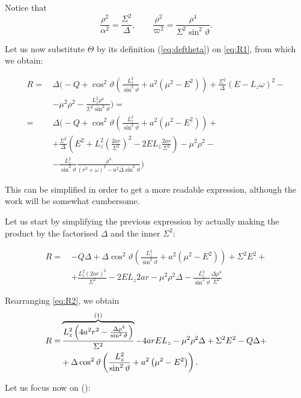 Notice that
\[
	\frac{\rho^2}{\alpha^2} = \frac{\Sigma^2}{\Delta}, \qquad \frac{\rho^2}{\varpi^2} = \frac{\rho^4}{\Sigma^2 \sin^2\vartheta}.
\]

Let us now substitute $\Theta$ by its definition (\autoref{eq:deftheta}) on \autoref{eq:R1}, from which we obtain:

\begin{align}
	R =\,& \Delta \biggl( -Q + \cos^2\vartheta\left( \frac{L_z^2}{\sin^2\vartheta} + a^2 (\mu^2 - E^2) \right) + \frac{\Sigma^2}{\Delta}(E - L_z\omega)^2 - \nonumber \\
	&- \mu^2\rho^2 - \frac{L_z^2\rho^4}{\Sigma^2\sin^2\vartheta} \biggr) = \nonumber \\
	=\,& \Delta \biggl( -Q + \cos^2\vartheta\left( \frac{L_z^2}{\sin^2\vartheta} + a^2 (\mu^2 - E^2) \right) + \nonumber \\
	&+ \frac{\Sigma^2}{\Delta}\left( E^2 + L_z^2\left( \frac{2ar}{\Sigma^2} \right)^2 - 2EL_z\frac{2ar}{\Sigma^2} \right)  - \mu^2\rho^2 - \nonumber \\
	&- \frac{L_z^2}{\sin^2\vartheta}\frac{\rho^4}{(r^2 + \omega)^2 - a^2\Delta\sin^2\vartheta} \biggr)
\end{align}

This can be simplified in order to get a more readable expression, although the work will be somewhat cumbersome.

Let us start by simplifying the previous expression by actually making the product by the factorised $\Delta$ and the inner $\Sigma^2$:

\begin{align}
	R =\,& -Q\Delta + \Delta\cos^2\vartheta\left( \frac{L_z^2}{\sin^2\vartheta} + a^2 (\mu^2 - E^2) \right) + \Sigma^2 E^2 + \nonumber \\
	&+ \frac{L_z^2 (2ar)^2}{\Sigma^2} - 2 E L_z 2ar  - \mu^2\rho^2\Delta - \frac{L_z^2}{\sin^2\vartheta}\frac{\Delta\rho^4}{\Sigma^2}
	\label{eq:R2}
\end{align}

Rearranging \autoref{eq:R2}, we obtain
\begin{align}
	R =& \overbrace{\frac{L_z^2 \left(4a^2r^2 - \frac{\Delta\rho^4}{\sin^2\vartheta}\right)}{\Sigma^2}}^{\text{(\dag)}} - 4 a r E L_z - \mu^2 \rho^2 \Delta + \Sigma^2 E^2 - Q \Delta + \nonumber \\ 
	&+ \Delta\cos^2\vartheta\left(\frac{L_z^2}{\sin^2\vartheta} + a^2\left(\mu^2 - E^2\right)\right).
\end{align}

Let us focus now on (\dag):

